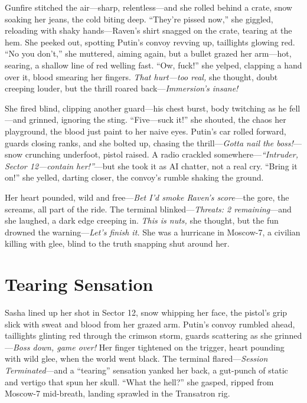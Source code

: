 \documentclass[12pt]{book}
\begin{document}
Gunfire stitched the air—sharp, relentless—and she rolled behind a crate, snow soaking her jeans, the cold biting deep. “They’re pissed now,” she giggled, reloading with shaky hands—Raven’s shirt snagged on the crate, tearing at the hem. She peeked out, spotting Putin’s convoy revving up, taillights glowing red. “No you don’t,” she muttered, aiming again, but a bullet grazed her arm—hot, searing, a shallow line of red welling fast. “Ow, fuck!” she yelped, clapping a hand over it, blood smearing her fingers. \textit{That hurt—too real,} she thought, doubt creeping louder, but the thrill roared back—\textit{Immersion’s insane!}

She fired blind, clipping another guard—his chest burst, body twitching as he fell—and grinned, ignoring the sting. “Five—suck it!” she shouted, the chaos her playground, the blood just paint to her naive eyes. Putin’s car rolled forward, guards closing ranks, and she bolted up, chasing the thrill—\textit{Gotta nail the boss!}—snow crunching underfoot, pistol raised. A radio crackled somewhere—\textit{“Intruder, Sector 12—contain her!”}—but she took it as AI chatter, not a real cry. “Bring it on!” she yelled, darting closer, the convoy’s rumble shaking the ground.

Her heart pounded, wild and free—\textit{Bet I’d smoke Raven’s score}—the gore, the screams, all part of the ride. The terminal blinked—\textit{Threats: 2 remaining}—and she laughed, a dark edge creeping in. \textit{This is nuts,} she thought, but the fun drowned the warning—\textit{Let’s finish it.} She was a hurricane in Moscow-7, a civilian killing with glee, blind to the truth snapping shut around her.

\section{Tearing Sensation}

Sasha lined up her shot in Sector 12, snow whipping her face, the pistol’s grip slick with sweat and blood from her grazed arm. Putin’s convoy rumbled ahead, taillights glinting red through the crimson storm, guards scattering as she grinned—\textit{Boss down, game over!} Her finger tightened on the trigger, heart pounding with wild glee, when the world went black. The terminal flared—\textit{Session Terminated}—and a “tearing” sensation yanked her back, a gut-punch of static and vertigo that spun her skull. “What the hell?” she gasped, ripped from Moscow-7 mid-breath, landing sprawled in the Transatron rig.
\end{document}
